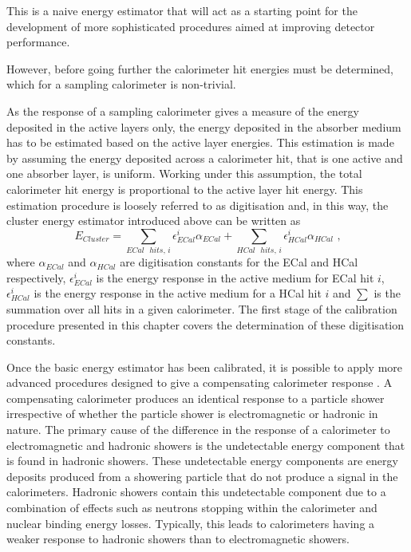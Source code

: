 

This is a naive energy estimator that will act as a starting point for the development of more sophisticated procedures aimed at improving detector performance.  


However, before going further the calorimeter hit energies must be determined, which for a sampling calorimeter is non-trivial.  

As the response of a sampling calorimeter gives a measure of the energy deposited in the active layers only, the energy deposited in the absorber medium has to be estimated based on the active layer energies.  This estimation is made by assuming the energy deposited across a calorimeter hit, that is one active and one absorber layer, is uniform.  Working under this assumption, the total calorimeter hit energy is proportional to the active layer hit energy.  This estimation procedure is loosely referred to as digitisation and, in this way, the cluster energy estimator introduced above can be written as
%
\begin{equation}
E_{Cluster} = \sum_{ECal \text{ } hits \text{, }i} \epsilon^{i}_{ECal} \alpha_{ECal} + \sum_{HCal \text{ } hits \text{, }i} \epsilon^{i}_{HCal} \alpha_{HCal} \text{ ,}
\end{equation}
%
\noindent where $\alpha_{ECal}$ and $\alpha_{HCal}$ are digitisation constants for the ECal and HCal respectively, $\epsilon^{i}_{ECal}$ is the energy response in the active medium for ECal hit $i$, $\epsilon^{i}_{HCal}$ is the energy response in the active medium for a HCal hit $i$ and $\sum$ is the summation over all hits in a given calorimeter.  The first stage of the calibration procedure presented in this chapter covers the determination of these digitisation constants.  

Once the basic energy estimator has been calibrated, it is possible to apply more advanced procedures designed to give a compensating calorimeter response \cite{arXiv:0907.3577}.  A compensating calorimeter produces an identical response to a particle shower irrespective of whether the particle shower is electromagnetic or hadronic in nature.  The primary cause of the difference in the response of a calorimeter to electromagnetic and hadronic showers is the undetectable energy component that is found in hadronic showers.  These undetectable energy components are energy deposits produced from a showering particle that do not produce a signal in the calorimeters.  Hadronic showers contain this undetectable component due to a combination of effects such as neutrons stopping within the calorimeter and nuclear binding energy losses.  Typically, this leads to calorimeters having a weaker response to hadronic showers than to electromagnetic showers.  

